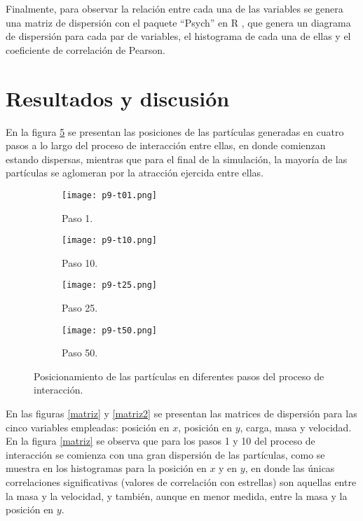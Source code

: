 \documentclass{article}
\begin{document}
Finalmente, para observar la relación entre cada una de las variables se genera una matriz de dispersión con el paquete ``Psych'' en R \cite{psy}, que genera un diagrama de dispersión para cada par de variables, el histograma de cada una de ellas y el coeficiente de  correlación de Pearson.

\section{Resultados y discusión}
En la figura \ref{partículas} se presentan las posiciones de las partículas generadas en cuatro pasos a lo largo del proceso de interacción entre ellas, en donde comienzan estando dispersas, mientras que para el final de la simulación, la mayoría de las partículas se aglomeran por la atracción ejercida entre ellas.

\begin{figure}
\centering
\begin{subfigure}[b]{0.49\linewidth}
\texttt{[image: p9-t01.png]}
\caption{Paso 1.}
\label{1}
\end{subfigure}
\begin{subfigure}[b]{0.49\linewidth}
\texttt{[image: p9-t10.png]}
\caption{Paso 10.}
\label{2}
\end{subfigure}
\begin{subfigure}[b]{0.49\linewidth}
\texttt{[image: p9-t25.png]}
\caption{Paso 25.}
\label{3}
\end{subfigure}
\begin{subfigure}[b]{0.49\linewidth}
\texttt{[image: p9-t50.png]}
\caption{Paso 50.}
\label{4}
\end{subfigure}
\caption{Posicionamiento de las partículas en diferentes pasos del proceso de interacción.}
\label{partículas}
\end{figure}

En las figuras \ref{matriz} y \ref{matriz2} se presentan las matrices de dispersión para las cinco variables empleadas: posición en $x$, posición en $y$, carga, masa y velocidad. En la figura \ref{matriz} se observa que para los pasos 1 y 10 del proceso de interacción se comienza con una gran dispersión de las partículas, como se muestra en los histogramas para la posición en $x$ y en $y$, en donde las únicas correlaciones significativas (valores de correlación con estrellas) son aquellas entre la masa y la velocidad, y también, aunque en menor medida, entre la masa y la posición en $y$.
\end{document}
